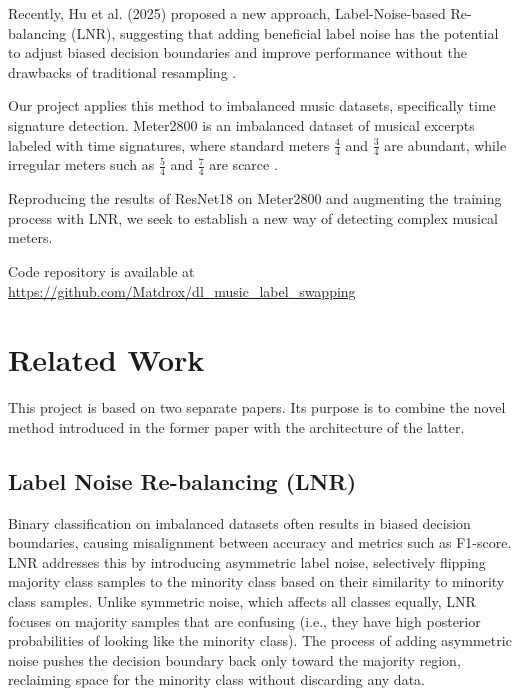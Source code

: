 \documentclass{article}
\begin{document}
Recently, Hu et al. (2025) proposed a new approach, Label-Noise-based Re-balancing (LNR), suggesting that adding beneficial label noise has the potential to adjust biased decision boundaries and improve performance without the drawbacks of traditional resampling \cite{lnr}.

Our project applies this method to imbalanced music datasets, specifically time signature detection. Meter2800 is an imbalanced dataset of musical excerpts labeled with time signatures, where standard meters $\frac{4}{4}$ and $\frac{3}{4}$ are abundant, while irregular meters such as $\frac{5}{4}$ and $\frac{7}{4}$ are scarce \cite{meter2800}.

Reproducing the results of ResNet18 on Meter2800 and augmenting the training process with LNR, we seek to establish a new way of detecting complex musical meters.

Code repository is available at \url{https://github.com/Matdrox/dl_music_label_swapping}


\section{Related Work}

This project is based on two separate papers. Its purpose is to combine the novel method introduced in the former paper with the architecture of the latter.

\subsection{Label Noise Re-balancing (LNR)}

Binary classification on imbalanced datasets often results in biased decision boundaries, causing misalignment between accuracy and metrics such as F1-score. LNR addresses this by introducing asymmetric label noise, selectively flipping majority class samples to the minority class based on their similarity to minority class samples. Unlike symmetric noise, which affects all classes equally, LNR focuses on majority samples that are confusing (i.e., they have high posterior probabilities of looking like the minority class). The process of adding asymmetric noise pushes the decision boundary back only toward the majority region, reclaiming space for the minority class without discarding any data.
\end{document}
